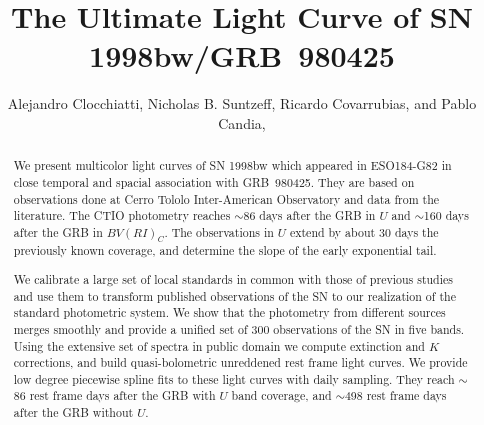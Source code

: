 \documentclass[12pt,preprint]{aastex}
\begin{document}
\title{The Ultimate Light Curve of SN 1998bw/GRB~980425}

\author{
Alejandro Clocchiatti,
Nicholas B. Suntzeff,
Ricardo Covarrubias,
and
Pablo Candia,
}

%
%
%
%
%

\begin{abstract}
We present multicolor light curves of SN 1998bw which appeared
in ESO184-G82 in close temporal and spacial association with GRB~980425.
%
They are based on observations done at Cerro Tololo
Inter-American Observatory and data from the literature.
%
The CTIO photometry reaches $\sim$86 days after the GRB in $U$ and $\sim$160
days after the GRB in $BV(RI)_C$.
%
The observations in $U$ extend by
about 30 days the previously known coverage,
and determine the slope of the early exponential tail.

We calibrate a large set of local standards in common with those
of previous studies and use them to transform published
observations of the SN to our realization of the standard photometric system.
%
We show that the photometry from different sources merges smoothly and
provide a unified set of 300 observations of the SN in five bands.
%
Using the extensive set of spectra in public domain we compute
extinction and $K$ corrections, and build quasi-bolometric unreddened
rest frame light curves.
%
We provide low degree piecewise spline fits to these light curves
with daily sampling.
%
They reach
$\sim$86 rest frame days after the GRB with $U$ band coverage, and 
$\sim$498 rest frame days after the GRB without $U$.
\end{abstract}

\end{document}
